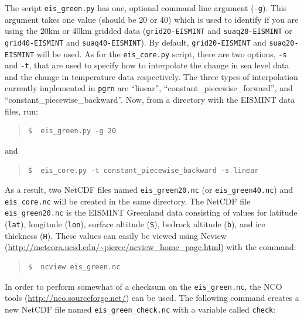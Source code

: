 \documentclass[11pt,final]{amsart}
\begin{document}
\noindent The script \verb|eis_green.py| has one, optional command line argument (\verb|-g|). This argument takes one value (should be 20 or 40) which is used to identify if you are using the 20km or 40km gridded data (\verb|grid20-EISMINT| and \verb|suaq20-EISMINT| or \verb|grid40-EISMINT| and \verb|suaq40-EISMINT|). By default, \verb|grid20-EISMINT| and \verb|suaq20-EISMINT| will be used. As for the \verb|eis_core.py| script, there are two options, \verb|-s| and \verb|-t|, that are used to specify how to interpolate the change in sea level data and the change in temperature data respectively. The three types of interpolation currently implemented in \verb|pgrn| are ``linear'', ``constant\_piecewise\_forward'', and ``constant\_piecewise\_backward''.  Now, from a directory with the EISMINT data files, run:

\small\begin{quote}\begin{verbatim}
$  eis_green.py -g 20
\end{verbatim}
\end{quote}\normalsize

and

\small\begin{quote}\begin{verbatim}
$  eis_core.py -t constant_piecewise_backward -s linear
\end{verbatim}
\end{quote}\normalsize

\noindent As a result, two NetCDF files named \verb|eis_green20.nc| (or \verb|eis_green40.nc|) and \verb|eis_core.nc| will be created in the same directory.  The NetCDF file \verb|eis_green20.nc| is the EISMINT Greenland data consisting of values for latitude (\verb|lat|), longitude (\verb|lon|), surface altitude (\verb|S|), bedrock altitude (\verb|b|), and ice thickness (\verb|H|).  These values can easily be viewed using Ncview (\url{http://meteora.ucsd.edu/~pierce/ncview_home_page.html}) with the command:

\small\begin{quote}\begin{verbatim}
$  ncview eis_green.nc
\end{verbatim}
\end{quote}\normalsize

\noindent In order to perform somewhat of a checksum on the \verb|eis_green.nc|, the NCO tools (\url{http://nco.sourceforge.net/}) can be used.  The following command creates a new NetCDF file named \verb|eis_green_check.nc| with a variable called \verb|check|:
\end{document}
